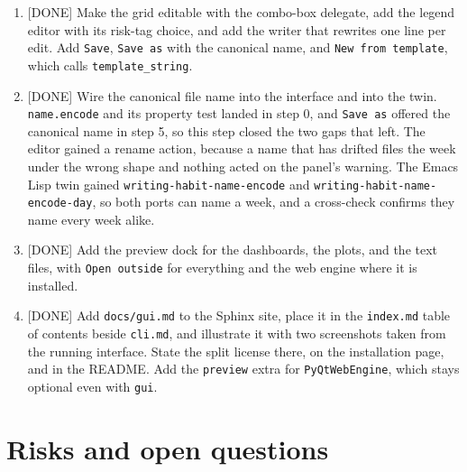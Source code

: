 \documentclass[11pt]{article}
\begin{document}
\begin{enumerate}
both the file reader and the in-memory grid, so one rule reads a legend row.
This step shows a table and writes nothing.
\item {[}DONE] Make the grid editable with the combo-box delegate, add the legend
editor with its risk-tag choice, and add the writer that rewrites one line
per edit. Add \texttt{Save}, \texttt{Save as} with the canonical name, and \texttt{New from
   template}, which calls \texttt{template\_string}.
\item {[}DONE] Wire the canonical file name into the interface and into the twin.
\texttt{name.encode} and its property test landed in step 0, and \texttt{Save as} offered
the canonical name in step 5, so this step closed the two gaps that left.
The editor gained a rename action, because a name that has drifted files the
week under the wrong shape and nothing acted on the panel's warning. The
Emacs Lisp twin gained \texttt{writing-habit-name-encode} and
\texttt{writing-habit-name-encode-day}, so both ports can name a week, and a
cross-check confirms they name every week alike.
\item {[}DONE] Add the preview dock for the dashboards, the plots, and the text
files, with \texttt{Open outside} for everything and the web engine where it is
installed.
\item {[}DONE] Add \texttt{docs/gui.md} to the Sphinx site, place it in the \texttt{index.md} table
of contents beside \texttt{cli.md}, and illustrate it with two screenshots taken
from the running interface. State the split license there, on the
installation page, and in the README. Add the \texttt{preview} extra for
\texttt{PyQtWebEngine}, which stays optional even with \texttt{gui}.
\end{enumerate}
\section{Risks and open questions}
\label{sec:org556f1fb}
\end{document}
